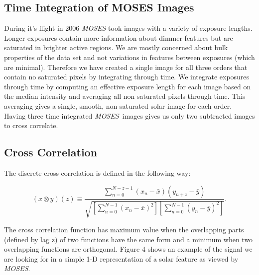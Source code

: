 \documentclass[]{aastex6}
\newcommand{\MOSES}{\textit{MOSES}}
\begin{document}
\subsection{Time Integration of MOSES Images}
	During it's flight in 2006 \textit{MOSES} took images with a variety of exposure lengths.  Longer exposures contain more information about dimmer features but are saturated in brighter active regions.  We are mostly concerned about bulk properties of the data set and not variations in features between exposures (which are minimal).  Therefore we have created a single image for all three orders that contain no saturated pixels by integrating through time.  We integrate exposures through time by computing an effective exposure length for each image based on the median intensity and averaging all non saturated pixels through time. This averaging gives a single, smooth, non saturated solar image for each order. Having three time integrated \MOSES \ images gives us only two subtracted images to cross correlate. 

\subsection{Cross Correlation}
The discrete cross correlation is defined in the following way:

\begin{equation}
(x \otimes y) (z) \equiv \dfrac{ \sum_{n=0}^{N-z-1} (x_n-\bar{x})(y_{n+z}-\bar{y})   }{\sqrt{[\sum_{n=0}^{N-1} (x_n-\bar{x})^2][\sum_{n=0}^{N-1} (y_{n}-\bar{y})^2 ]}}.
\end{equation}

The cross correlation function has maximum value when the overlapping parts (defined by lag z) of two functions have the same form and a minimum when two overlapping functions are orthogonal. Figure 4 shows an example of the signal we are looking for in a simple 1-D representation of a solar feature as viewed by \MOSES.  
\end{document}
